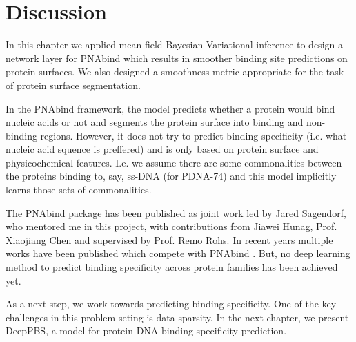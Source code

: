 \section{Discussion}
In this chapter we applied mean field Bayesian Variational inference to
design a network layer for PNAbind which results in smoother binding site predictions on protein surfaces. We also designed a smoothness metric appropriate for the task of protein surface segmentation.

In the PNAbind framework, the model predicts whether a protein would bind nucleic acids or not and segments the protein surface into binding and non-binding regions. However, it does not try to predict binding specificity (i.e. what nucleic acid squence is preffered) and is only based on protein surface and physicochemical features. I.e. we assume there are some commonalities between the proteins binding to, say, ss-DNA (for PDNA-74) and this model implicitly learns those sets of commonalities. 

The PNAbind package has been published as joint work led by Jared Sagendorf, who mentored me in this project, with contributions from Jiawei Hunag, Prof. Xiaojiang Chen and supervised by Prof. Remo Rohs\citep{Sagendorf2024}. In recent years multiple works have been published which compete with PNAbind \citep{gainza2020deciphering, gligorijevic2021structure, yuan2022alphafold2, xia2021graphbind, tubiana2022scannet, krapp2023pesto, li2023geobind, sverrisson2021fast}. But, no deep learning method to predict binding specificity across protein families has been achieved yet.

As a next step, we work towards predicting binding specificity. One of the key challenges in this problem seting is data sparsity. In the next chapter, we present DeepPBS, a model for protein-DNA  binding specificity prediction.  
